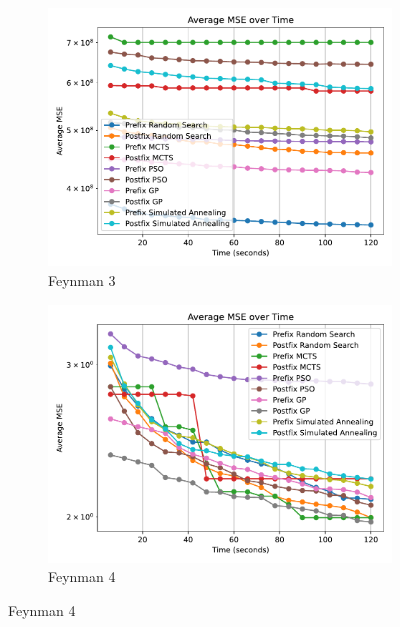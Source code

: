 \documentclass[runningheads]{llncs}
\begin{document}
\begin{figure}
    \vspace{0.5cm}
    
    \begin{subfigure}[b]{0.4\textwidth}
        \includegraphics[width=\linewidth, keepaspectratio]{AIFeynman_Benchmarks/Feynman_Benchmark_3.pdf}
        \caption{Feynman 3}
        \label{subfig:feynman_3}
    \end{subfigure}
    \begin{subfigure}[b]{0.4\textwidth}
        \includegraphics[width=\linewidth, keepaspectratio]{AIFeynman_Benchmarks/Feynman_Benchmark_4.pdf}
        \caption{Feynman 4}
        \label{subfig:feynman_4}
    \end{subfigure}
    

\end{figure}
\end{document}
